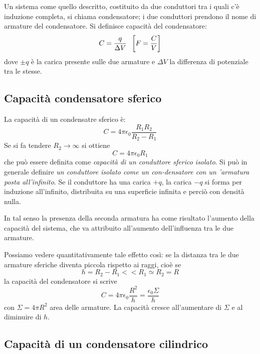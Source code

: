\documentclass[class=book, crop=false, oneside, 12pt]{standalone}
\begin{document}
Un sistema come quello descritto, costituito da due conduttori tra i quali c'è induzione completa, si chiama condensatore; i due conduttori prendono il nome di armature del condensatore. 
Si definisce capacità del condensatore:
\begin{equation}
    C = \frac{q}{\Delta V} \hspace{0.2cm} \left[F = \frac{C}{V}\right]
\end{equation}
dove \(\pm q\) è la carica presente sulle due armature e \(\Delta V\) la differenza di potenziale tra le stesse.

\subsection{Capacità condensatore sferico}

La capacità di un condensatre sferico è:
\begin{equation}
    C = 4 \pi \epsilon_0 \frac{R_1 R_2}{R_2 - R_1}
\end{equation}
Se si fa tendere \(R_2 \rightarrow \infty\) si ottiene
\begin{equation}
    C = 4 \pi \epsilon_0 R_1
\end{equation}
che può essere definita come \emph{capacità di un conduttore sferico isolato}.
Si può in generale definire \emph{un conduttore isolato come un con-densatore con un 'armatura posta all'infinito}.
Se il conduttore ha una carica \(+q\), la carica \(- q\) si forma per induzione all'infinito, distribuita su una superficie infinita e perciò con densità nulla.

In tal senso la presenza della seconda armatura ha come risultato l'aumento della capacità del sistema, che va attribuito all'aumento dell'influenza tra le due armature.

Possiamo vedere quantitativamente tale effetto così: se la distanza tra le due armature sferiche diventa piccola rispetto ai raggi, cioè se 
\begin{equation*}
    h = R_2 - R_1 << R_1 \simeq R_2 = R
\end{equation*}
la capacità del condensatore si scrive
\begin{equation} \label{capacita_condensatore}
    C = 4 \pi \epsilon_0 \frac{R^2}{h} = \frac{\epsilon_0 \Sigma}{h}
\end{equation}
con \(\Sigma = 4 \pi R^2\) area delle armature. 
La capacità cresce all'aumentare di \(\Sigma\) e al diminuire di \(h\).

\subsection{Capacità di un condensatore cilindrico}
\end{document}
